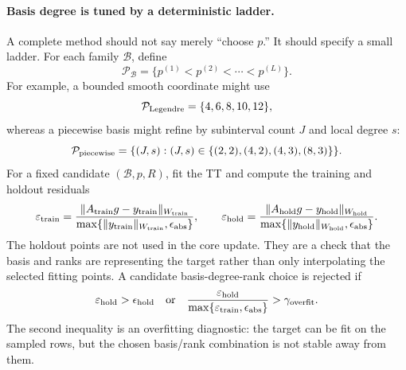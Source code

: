 \documentclass[11pt]{article}
\numberwithin{equation}{section}
\begin{document}
\paragraph{Basis degree is tuned by a deterministic ladder.}
A complete method should not say merely ``choose \(p\).''  It should specify
a small ladder.  For each family \(\mathcal B\), define
\begin{equation}
    \mathcal P_{\mathcal B}
    =
    \{p^{(1)}<p^{(2)}<\cdots<p^{(L)}\}.
    \label{eq:p30-basis-degree-ladder}
\end{equation}
For example, a bounded smooth coordinate might use
\begin{equation}
    \mathcal P_{\rm Legendre}=\{4,6,8,10,12\},
    \label{eq:p30-basis-legendre-ladder}
\end{equation}
whereas a piecewise basis might refine by subinterval count \(J\) and local
degree \(s\):
\begin{equation}
    \mathcal P_{\rm piecewise}
    =
    \{(J,s):(J,s)\in\{(2,2),(4,2),(4,3),(8,3)\}\}.
    \label{eq:p30-basis-piecewise-ladder}
\end{equation}
For a fixed candidate \((\mathcal B,p,R)\), fit the TT and compute the training
and holdout residuals
\begin{equation}
    \varepsilon_{\rm train}
    =
    \frac{\|A_{\rm train}g-y_{\rm train}\|_{W_{\rm train}}}
         {\max\{\|y_{\rm train}\|_{W_{\rm train}},\epsilon_{\rm abs}\}},
    \qquad
    \varepsilon_{\rm hold}
    =
    \frac{\|A_{\rm hold}g-y_{\rm hold}\|_{W_{\rm hold}}}
         {\max\{\|y_{\rm hold}\|_{W_{\rm hold}},\epsilon_{\rm abs}\}}.
    \label{eq:p30-basis-residuals}
\end{equation}
The holdout points are not used in the core update.  They are a check that the
basis and ranks are representing the target rather than only interpolating the
selected fitting points.  A candidate basis-degree-rank choice is rejected if
\begin{equation}
    \varepsilon_{\rm hold}>\epsilon_{\rm hold}
    \quad\text{or}\quad
    \frac{\varepsilon_{\rm hold}}
         {\max\{\varepsilon_{\rm train},\epsilon_{\rm abs}\}}
    >\gamma_{\rm overfit}.
    \label{eq:p30-basis-holdout-reject}
\end{equation}
The second inequality is an overfitting diagnostic: the target can be fit on
the sampled rows, but the chosen basis/rank combination is not stable away
from them.
\end{document}
